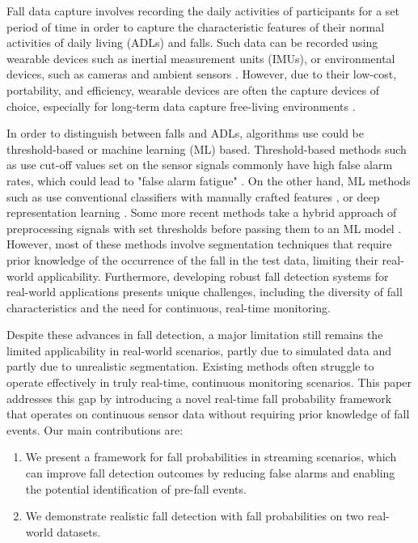 \documentclass[runningheads]{llncs}
\begin{document}
Fall data capture involves recording the daily activities of participants for a set period of time in order to capture the characteristic features of their normal activities of daily living (ADLs) and falls. Such data can be recorded using wearable devices such as inertial measurement units (IMUs), or environmental devices, such as cameras and ambient sensors \cite{gaya2024deep}. However, due to their low-cost, portability, and efficiency, wearable devices are often the capture devices of choice, especially for long-term data capture free-living environments \cite{mohan2024artificial}.

In order to distinguish between falls and ADLs, algorithms use could be threshold-based or machine learning (ML) based. Threshold-based methods such as \cite{de2021wearable} use cut-off values set on the sensor signals commonly have high false alarm rates, which could lead to "false alarm fatigue" \cite{mosquera2020automated}. On the other hand, ML methods such as  use conventional classifiers with manually crafted features \cite{son2022machine}, or deep representation learning \cite{liu2023deep}. Some more recent methods take a hybrid approach of preprocessing signals with set thresholds before passing them to an ML model \cite{fernandez2024edge}. However, most of these methods involve segmentation techniques that require prior knowledge of the occurrence of the fall in the test data, limiting their real-world applicability. Furthermore, developing robust fall detection systems for real-world applications presents unique challenges, including the diversity of fall characteristics and the need for continuous, real-time monitoring.

Despite these advances in fall detection, a major limitation still remains the limited applicability in real-world scenarios, partly due to simulated data and partly due to unrealistic segmentation. Existing methods often struggle to operate effectively in truly real-time, continuous monitoring scenarios. This paper addresses this gap by introducing a novel real-time fall probability framework that operates on continuous sensor data without requiring prior knowledge of fall events. Our main contributions are:

\begin{enumerate}
    \item We present a framework for fall probabilities in streaming scenarios, which can improve fall detection outcomes by reducing false alarms and enabling the potential identification of pre-fall events.
    \item We demonstrate realistic fall detection with fall probabilities on two real-world datasets.
\end{enumerate}
\end{document}
